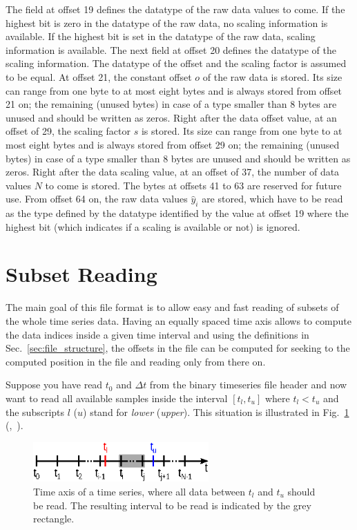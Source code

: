 \documentclass[a4paper,10pt]{article}
\begin{document}
The field at offset 19 defines the datatype of the raw data values to come.
If the highest bit is zero in the datatype of the raw data, no scaling information is available.
If the highest bit is set in the datatype of the raw data, scaling information is available.
The next field at offset 20 defines the datatype of the scaling information.
The datatype of the offset and the scaling factor is assumed to be equal.
At offset 21, the constant offset $o$ of the raw data is stored. Its size can range from one byte to at most eight bytes
and is always stored from offset 21 on; the remaining (unused bytes) in case of a type smaller than 8 bytes are unused and should be written as zeros.
Right after the data offset value, at an offset of 29, the scaling factor $s$ is stored.
Its size can range from one byte to at most eight bytes
and is always stored from offset 29 on; the remaining (unused bytes) in case of a type smaller than 8 bytes are unused and should be written as zeros.
Right after the data scaling value, at an offset of 37, the number of data values $N$ to come is stored.
The bytes at offsets 41 to 63 are reserved for future use.
From offset 64 on, the raw data values $\hat{y}_i$ are stored, which have to be read as the type defined by the datatype
identified by the value at offset 19 where the highest bit (which indicates if a scaling is available or not) is ignored.

\section{Subset Reading}\label{sec:subset_reading}
The main goal of this file format is to allow easy and fast reading of subsets of the whole time series data.
Having an equally spaced time axis allows to compute the data indices inside a given time interval and using the definitions in Sec.~\ref{sec:file_structure},
the offsets in the file can be computed for seeking to the computed position in the file and reading only from there on.

Suppose you have read $t_0$ and $\Delta t$ from the binary timeseries file header and now want to read all available samples
inside the interval $[t_l, t_u]$ where $t_l < t_u$ and the subscripts $l$ ($u$) stand for \textit{lower} (\textit{upper}).
This situation is illustrated in Fig.~\ref{fig:timeAxis}
(,~).
\begin{figure}[htbp]
  \centering
  \includegraphics[width=0.6\textwidth]{timeAxis.eps}
  \caption{Time axis of a time series, where all data between $t_l$ and $t_u$ should be read.
  The resulting interval to be read is indicated by the grey rectangle.}
  \label{fig:timeAxis}
\end{figure}
\end{document}
